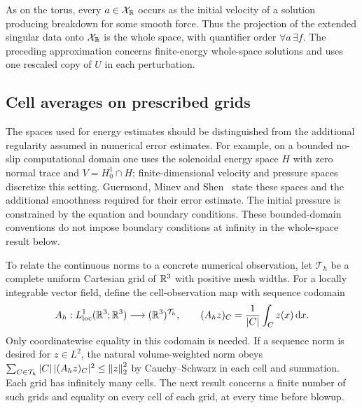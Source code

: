 As on the torus, every $a\in\mathcal X_{\mathbb R}$ occurs as the initial velocity of a solution producing breakdown for some smooth force. Thus the projection of the extended singular data onto $\mathcal X_{\mathbb R}$ is the whole space, with quantifier order $\forall a\,\exists f$. The preceding approximation concerns finite-energy whole-space solutions and uses one rescaled copy of $U$ in each perturbation.

\subsection{Cell averages on prescribed grids}\label{sec:grids}
The spaces used for energy estimates should be distinguished from the
additional regularity assumed in numerical error estimates. For example,
on a bounded no-slip computational domain one uses the solenoidal energy
space $H$ with zero normal trace and $V=H^1_0\cap H$; finite-dimensional
velocity and pressure spaces discretize this setting. Guermond, Minev and
Shen~\cite[Section~2 and Theorem~3.2]{gms} state these spaces and the
additional smoothness required for their error estimate. The initial
pressure is constrained by the equation and boundary conditions. These
bounded-domain conventions do not impose boundary conditions at infinity
in the whole-space result below.

To relate the continuous norms to a concrete numerical observation, let $\mathcal T_h$ be a complete uniform Cartesian grid of $\mathbb R^3$ with positive mesh widths. For a locally integrable vector field, define the cell-observation map with sequence codomain
\[
 A_h:L^1_{\mathrm{loc}}(\mathbb R^3;\mathbb R^3)\longrightarrow(\mathbb R^3)^{\mathcal T_h},
 \qquad (A_hz)_C=\frac1{|C|}\int_Cz(x)\,\mathrm d x.
\]
Only coordinatewise equality in this codomain is needed. If a sequence norm is desired for $z\in L^2$, the natural volume-weighted norm obeys
$\sum_{C\in\mathcal T_h}|C|\,|(A_hz)_C|^2\le\left\lVert z\right\rVert_2^2$
by Cauchy--Schwarz in each cell and summation. Each grid has infinitely many cells. The next result concerns a finite number of such grids and equality on every cell of each grid, at every time before blowup.

